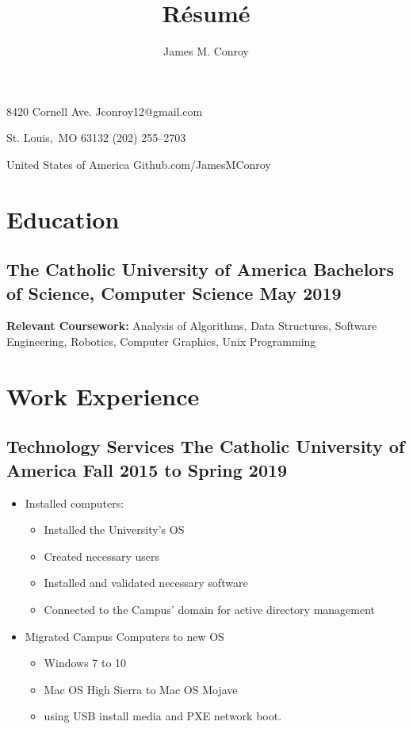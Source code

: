 \documentclass[12pt, letterpaper]{article}
\author{James M. Conroy}
\title{R\'esum\'e}
\makeatletter
\renewcommand{\maketitle} {
	\begin{center}
	{\Large\bfseries
	\theauthor}

	\end{center}

	\setlength{\parindent}{0pt}
	\setlength{\parskip}{0em}
	8420 Cornell Ave.
	\hfill Jconroy12@gmail.com

	St. Louis,\ MO 63132
	\hfill (202) 255--2703

	United States of America
	\hfill Github.com/JamesMConroy
}
\makeatother
\begin{document}
\maketitle
\section{Education}
\subsection{The Catholic University of America \hspace {20pt} Bachelors of Science, Computer Science \hfill  May 2019 }

\noindent
\textbf{Relevant Coursework:}
Analysis of Algorithms,
Data Structures,
Software Engineering,
Robotics,
Computer Graphics,
Unix Programming

\section{Work Experience}
\subsection{Technology Services \hspace {30pt}The Catholic University of America \hfill Fall 2015 to Spring 2019}
\begin{itemize}
	\item Installed computers:
		\begin{itemize}
			\item Installed the University's OS
			\item Created necessary users
			\item Installed and validated necessary software
			\item Connected to the Campus' domain for active directory management
		\end{itemize}
	\item Migrated Campus Computers to new OS
		\begin{itemize}
			\item Windows 7 to 10
			\item Mac OS High Sierra to Mac OS Mojave
			\item using USB install media and PXE network boot.
		\end{itemize}
\end{itemize}
\end{document}
